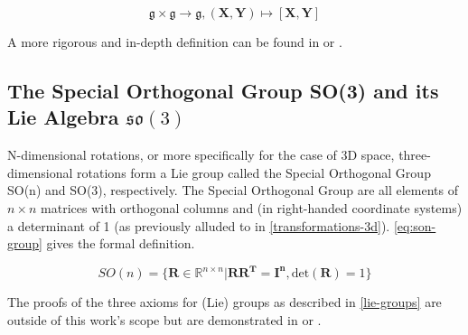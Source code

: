 \documentclass[headsepline, hidelinks, footsepline, footinclude=false, oneside, fontsize=11pt, paper=a4, listof=totoc, bibliography=totoc]{scrbook}
\begin{document}
\begin{equation}
\label{eq:alt-bi-map}
\mathfrak{g} \times \mathfrak{g} \rightarrow \mathfrak{g}, (\mathbf{X}, \mathbf{Y}) \mapsto [\mathbf{X}, \mathbf{Y}]
\end{equation} 

A more rigorous and in-depth definition can be found in \cite{hallLieGroupsLie2015} or \cite{erdmannIntroductionLieAlgebras2006}.

\subsection{The Special Orthogonal Group SO(3) and its Lie Algebra \(\mathfrak{so}(3)\) \label{so3}}
\label{sec:org1b22466}
    N-dimensional rotations, or more specifically for the case of 3D space, three-dimensional rotations form a
Lie group called the Special Orthogonal Group SO(n) and SO(3), respectively. 
The Special Orthogonal Group are all elements of \(n \times n\) matrices with orthogonal columns and (in right-handed coordinate systems) a determinant of 1 (as previously alluded to in \cref{transformations-3d}).
\cref{eq:son-group} gives the formal definition.

\begin{equation}
\label{eq:son-group}
SO(n)=\{\mathbf{R} \in  \mathbb{R}^{n\times n}|\mathbf{R}\mathbf{R^T} = \mathbf{I^n}, \text{det}(\mathbf{R}) = 1\} 
\end{equation}

The proofs of the three axioms for (Lie) groups as described in \cref{lie-groups} are outside of this work's scope but are demonstrated in \cite{murrayMathematicalIntroductionRobotic1994} or \cite{hallLieGroupsLie2015}.
\end{document}

